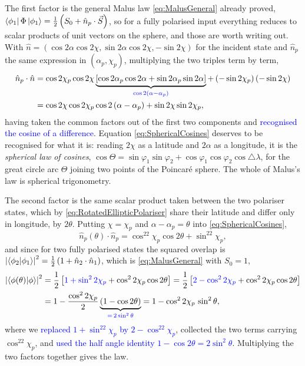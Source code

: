             The first factor is the general Malus law \ref{eq:MalusGeneral} already proved, $\bra{\phi_1}\Phi\ket{\phi_1}=\frac{1}{2}\left(S_0+\hat{n}_p\cdot\vec{S}\right)$, so for a fully polarised input everything reduces to scalar products of unit vectors on the sphere, and those are worth writing out. With $\hat{n}=\left(\cos2\alpha\cos2\chi,\sin2\alpha\cos2\chi,-\sin2\chi\right)$ for the incident state and $\hat{n}_p$ the same expression in $\left(\alpha_p,\chi_p\right)$, multiplying the two triples term by term,
            \begin{align}
                \hat{n}_p\cdot\hat{n} &= \cos2\chi_p\cos2\chi\underbrace{\left[\cos2\alpha_p\cos2\alpha+\sin2\alpha_p\sin2\alpha\right]}_{\textcolor{blue}{\cos2\left(\alpha-\alpha_p\right)}}+\left(-\sin2\chi_p\right)\left(-\sin2\chi\right) \nonumber \\
                &= \cos2\chi\cos2\chi_p\cos2\left(\alpha-\alpha_p\right)+\sin2\chi\sin2\chi_p , \label{eq:SphericalCosines}
            \end{align}
            having taken the common factors out of the first two components and \textcolor{blue}{recognised the cosine of a difference}. Equation \ref{eq:SphericalCosines} deserves to be recognised for what it is: reading $2\chi$ as a latitude and $2\alpha$ as a longitude, it is the \emph{spherical law of cosines}, $\cos\Theta=\sin\varphi_1\sin\varphi_2+\cos\varphi_1\cos\varphi_2\cos\triangle\lambda$, for the great circle arc $\Theta$ joining two points of the Poincaré sphere. The whole of Malus's law is spherical trigonometry.

            The second factor is the same scalar product taken between the two polariser states, which by \ref{eq:RotatedEllipticPolariser} share their latitude and differ only in longitude, by $2\theta$. Putting $\chi=\chi_p$ and $\alpha-\alpha_p=\theta$ into \ref{eq:SphericalCosines},
            \begin{equation*}
                \hat{n}_p(\theta)\cdot\hat{n}_p = \cos^22\chi_p\cos2\theta+\sin^22\chi_p ,
            \end{equation*}
            and since for two fully polarised states the squared overlap is $\left|\braket{\phi_2|\phi_1}\right|^2=\frac{1}{2}\left(1+\hat{n}_2\cdot\hat{n}_1\right)$, which is \ref{eq:MalusGeneral} with $S_0=1$,
            \begin{align}
                \left|\braket{\phi(\theta)|\phi}\right|^2 &= \frac{1}{2}\left[\textcolor{blue}{1+\sin^22\chi_p}+\cos^22\chi_p\cos2\theta\right] = \frac{1}{2}\left[\textcolor{blue}{2-\cos^22\chi_p}+\cos^22\chi_p\cos2\theta\right] \nonumber \\
                &= 1-\frac{\cos^22\chi_p}{2}\underbrace{\left(1-\cos2\theta\right)}_{\textcolor{blue}{=\,2\sin^2\theta}} = 1-\cos^22\chi_p\,\sin^2\theta , \label{eq:PolariserOverlap}
            \end{align}
            where we \textcolor{blue}{replaced $1+\sin^22\chi_p$ by $2-\cos^22\chi_p$}, collected the two terms carrying $\cos^22\chi_p$, and \textcolor{blue}{used the half angle identity $1-\cos2\theta=2\sin^2\theta$}. Multiplying the two factors together gives the law.

